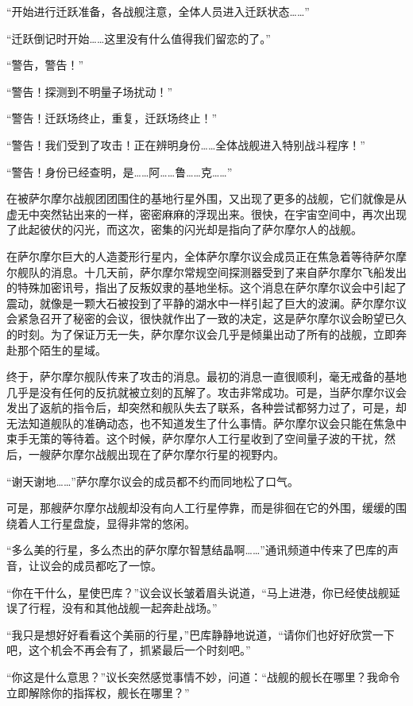 “开始进行迁跃准备，各战舰注意，全体人员进入迁跃状态……” 

“迁跃倒记时开始……这里没有什么值得我们留恋的了。” 

“警告，警告！” 

“警告！探测到不明量子场扰动！” 

“警告！迁跃场终止，重复，迁跃场终止！” 

“警告！我们受到了攻击！正在辨明身份……全体战舰进入特别战斗程序！” 

“警告！身份已经查明，是……阿……鲁……克……” 

在被萨尔摩尔战舰团团围住的基地行星外围，又出现了更多的战舰，它们就像是从虚无中突然钻出来的一样，密密麻麻的浮现出来。很快，在宇宙空间中，再次出现了此起彼伏的闪光，而这次，密集的闪光却是指向了萨尔摩尔人的战舰。 

在萨尔摩尔巨大的人造菱形行星内，全体萨尔摩尔议会成员正在焦急着等待萨尔摩尔舰队的消息。十几天前，萨尔摩尔常规空间探测器受到了来自萨尔摩尔飞船发出的特殊加密讯号，指出了反叛奴隶的基地坐标。这个消息在萨尔摩尔议会中引起了震动，就像是一颗大石被投到了平静的湖水中一样引起了巨大的波澜。萨尔摩尔议会紧急召开了秘密的会议，很快就作出了一致的决定，这是萨尔摩尔议会盼望已久的时刻。为了保证万无一失，萨尔摩尔议会几乎是倾巢出动了所有的战舰，立即奔赴那个陌生的星域。 

终于，萨尔摩尔舰队传来了攻击的消息。最初的消息一直很顺利，毫无戒备的基地几乎是没有任何的反抗就被立刻的瓦解了。攻击非常成功。可是，当萨尔摩尔议会发出了返航的指令后，却突然和舰队失去了联系，各种尝试都努力过了，可是，却无法知道舰队的准确动态，也不知道发生了什么事情。萨尔摩尔议会只能在焦急中束手无策的等待着。这个时候，萨尔摩尔人工行星收到了空间量子波的干扰，然后，一艘萨尔摩尔战舰出现在了萨尔摩尔行星的视野内。 

“谢天谢地……”萨尔摩尔议会的成员都不约而同地松了口气。 

可是，那艘萨尔摩尔战舰却没有向人工行星停靠，而是徘徊在它的外围，缓缓的围绕着人工行星盘旋，显得非常的悠闲。 

“多么美的行星，多么杰出的萨尔摩尔智慧结晶啊……”通讯频道中传来了巴库的声音，让议会的成员都吃了一惊。 

“你在干什么，星使巴库？”议会议长皱着眉头说道，“马上进港，你已经使战舰延误了行程，没有和其他战舰一起奔赴战场。” 

“我只是想好好看看这个美丽的行星，”巴库静静地说道，“请你们也好好欣赏一下吧，这个机会不再会有了，抓紧最后一个时刻吧。” 

“你这是什么意思？”议长突然感觉事情不妙，问道：“战舰的舰长在哪里？我命令立即解除你的指挥权，舰长在哪里？” 

